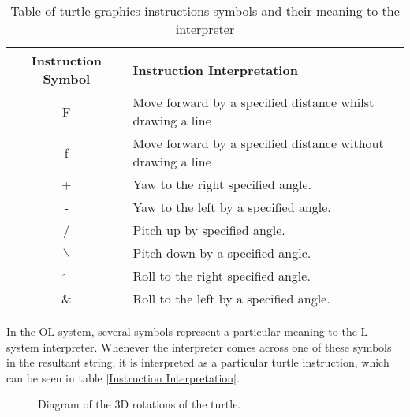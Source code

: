 \begin{table}[h!]
\centering
\begin{tabular}{ | c | l | }
\hline
	Instruction Symbol 	& Instruction Interpretation \\  
\hline
\hline
	F 					& Move forward by a specified distance whilst drawing a line\\
\hline
	f 					& Move forward by a specified distance without drawing a line\\
\hline
	+ 					& Yaw to the right specified angle.\\
\hline
	- 					& Yaw to the left by a specified angle.\\
\hline
	/ 					& Pitch up by specified angle. \\
\hline
	$\backslash$ 		& Pitch down by a specified angle.\\
\hline
	$\hat{}$ 			& Roll to the right specified angle.\\
\hline
	\& 					& Roll to the left by a specified angle.\\
\hline
\end{tabular}
\caption{Table of turtle graphics instructions symbols and their meaning to the interpreter}
\label{DOL-system instructions}
\end{table}
\FloatBarrier

\noindent
In the OL-system, several symbols represent a particular meaning to the L-system interpreter. Whenever the interpreter comes across one of these symbols in the resultant string, it is interpreted as a particular turtle instruction, which can be seen in table \ref{Instruction Interpretation}.

\begin{figure}[htbp]
	{\centering
		\setlength{\fboxrule}{1pt}
		\vspace{7px}
		\caption{Diagram of the 3D rotations of the turtle.} \label{3D turtle rotations}
	}
\end{figure}
\FloatBarrier

